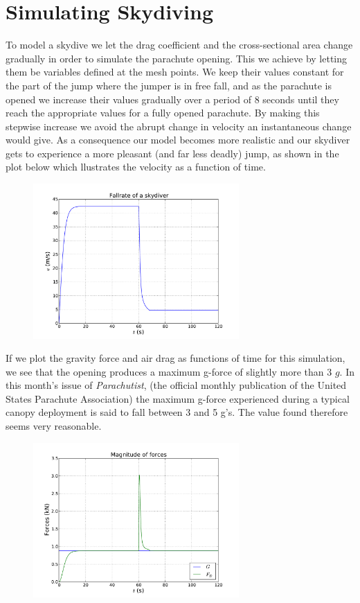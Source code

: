 \documentclass[a4paper, 11pt, notitlepage, english]{article}
\begin{document}
\clearpage

\section*{Simulating Skydiving}

To model a skydive we let the drag coefficient and the cross-sectional area change gradually in order to simulate the parachute opening. This we achieve by letting them be variables 
defined at the mesh points. We keep their values constant for the part of the jump where the jumper is in free fall, and as the parachute is opened we increase their values
gradually over a period of 8 seconds until they reach the appropriate values for a fully opened parachute. By making this stepwise increase we avoid the abrupt change in velocity an 
instantaneous change would give. As a consequence our model becomes more realistic and our skydiver gets to experience a more pleasant (and far less deadly) jump, as shown in the plot 
below which llustrates the velocity as a function of time.

\begin{figure}[htbp]
\centering
\includegraphics[width=0.7\textwidth]{fallrate}
\end{figure}

If we plot the gravity force and air drag as functions of time for this simulation, we see that the opening produces a maximum g-force of slightly more than 3 $g$. In this month's issue of \emph{Parachutist}, (the official monthly publication of the United States Parachute Association) the maximum g-force experienced during a typical canopy deployment is said to fall between 3 and 5 g's. The value found therefore seems very reasonable.

\begin{figure}
\centering
\includegraphics[width=0.7\textwidth]{magnitudeofforces} 
\end{figure}
\end{document}
